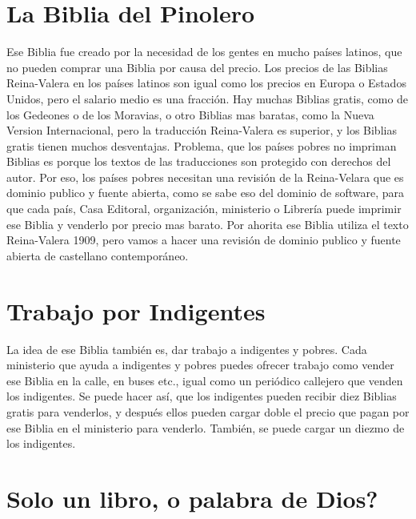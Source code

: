 \hypertarget{la-biblia-del-pinolero}{%
\section{La Biblia del Pinolero}\label{la-biblia-del-pinolero}}

Ese Biblia fue creado por la necesidad de los gentes en mucho países
latinos, que no pueden comprar una Biblia por causa del precio. Los
precios de las Biblias Reina-Valera en los países latinos son igual como
los precios en Europa o Estados Unidos, pero el salario medio es una
fracción. Hay muchas Biblias gratis, como de los Gedeones o de los
Moravias, o otro Biblias mas baratas, como la Nueva Version
Internacional, pero la traducción Reina-Valera es superior, y los
Biblias gratis tienen muchos desventajas. Problema, que los países
pobres no impriman Biblias es porque los textos de las traducciones son
protegido con derechos del autor. Por eso, los países pobres necesitan
una revisión de la Reina-Velara que es dominio publico y fuente abierta,
como se sabe eso del dominio de software, para que cada país, Casa
Editoral, organización, ministerio o Librería puede imprimir ese Biblia
y venderlo por precio mas barato. Por ahorita ese Biblia utiliza el
texto Reina-Valera 1909, pero vamos a hacer una revisión de dominio
publico y fuente abierta de castellano contemporáneo.

\hypertarget{trabajo-por-indigentes}{%
\section{Trabajo por Indigentes}\label{trabajo-por-indigentes}}

La idea de ese Biblia también es, dar trabajo a indigentes y pobres.
Cada ministerio que ayuda a indigentes y pobres puedes ofrecer trabajo
como vender ese Biblia en la calle, en buses etc., igual como un
periódico callejero que venden los indigentes. Se puede hacer así, que
los indigentes pueden recibir diez Biblias gratis para venderlos, y
después ellos pueden cargar doble el precio que pagan por ese Biblia en
el ministerio para venderlo. También, se puede cargar un diezmo de los
indigentes.

\hypertarget{solo-un-libro-o-palabra-de-dios}{%
\section{Solo un libro, o palabra de
Dios?}\label{solo-un-libro-o-palabra-de-dios}}

